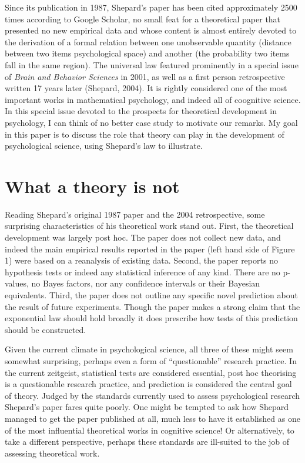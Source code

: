 \documentclass[english,doc]{apa6}
\begin{document}
Since its publication in 1987, Shepard's paper has been cited approximately 2500 times according to Google Scholar, no small feat for a theoretical paper that presented no new empirical data and whose content is almost entirely devoted to the derivation of a formal relation between one unobservable quantity (distance between two items psychological space) and another (the probability two items fall in the same region). The universal law featured prominently in a special issue of \emph{Brain and Behavior Sciences} in 2001, as well as a first person retrospective written 17 years later (Shepard, 2004). It is rightly considered one of the most important works in mathematical psychology, and indeed all of coognitive science. In this special issue devoted to the prospects for theoretical development in psychology, I can think of no better case study to motivate our remarks. My goal in this paper is to discuss the role that theory can play in the development of psychological science, using Shepard's law to illustrate.

\hypertarget{what-a-theory-is-not}{%
\section{What a theory is not}\label{what-a-theory-is-not}}

Reading Shepard's original 1987 paper and the 2004 retrospective, some surprising characteristics of his theoretical work stand out. First, the theoretical development was largely post hoc. The paper does not collect new data, and indeed the main empirical results reported in the paper (left hand side of Figure 1) were based on a reanalysis of existing data. Second, the paper reports no hypothesis tests or indeed any statistical inference of any kind. There are no p-values, no Bayes factors, nor any confidence intervals or their Bayesian equivalents. Third, the paper does not outline any specific novel prediction about the result of future experiments. Though the paper makes a strong claim that the exponential law should hold broadly it does prescribe how tests of this prediction should be constructed.

Given the current climate in psychological science, all three of these might seem somewhat surprising, perhaps even a form of ``questionable'' research practice. In the current zeitgeist, statistical tests are considered essential, post hoc theorising is a questionable research practice, and prediction is considered the central goal of theory. Judged by the standards currently used to assess psychological research Shepard's paper fares quite poorly. One might be tempted to ask how Shepard managed to get the paper published at all, much less to have it established as one of the most influential theoretical works in cognitive science! Or alternatively, to take a different perspective, perhaps these standards are ill-suited to the job of assessing theoretical work.
\end{document}
